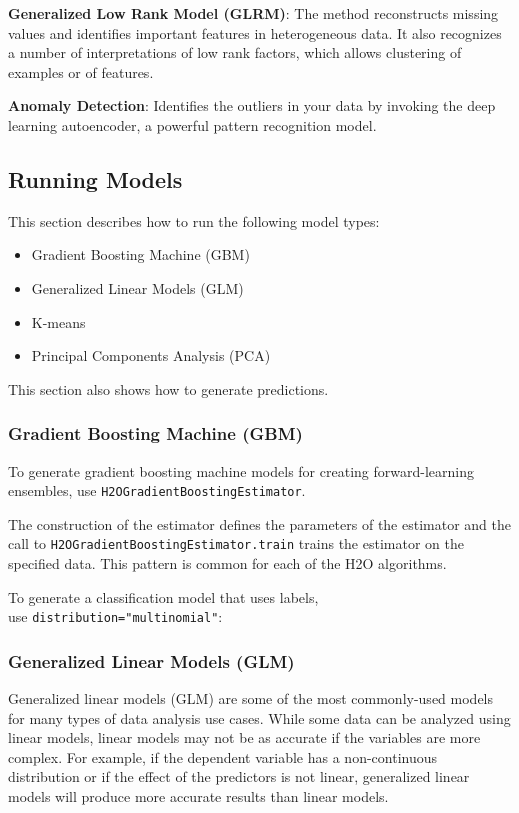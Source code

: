 {{\textbf{Generalized Low Rank Model (GLRM)}}: The method reconstructs missing values and identifies important features in heterogeneous data. It also recognizes a number of  interpretations of low rank factors, which allows clustering of examples or of features.

{\textbf{Anomaly Detection}}: Identifies the outliers in your data by invoking the deep learning autoencoder, a powerful pattern recognition model.

\subsection{Running Models}
This section describes how to run the following model types:

\begin{itemize}
\item Gradient Boosting Machine (GBM)
\item Generalized Linear Models (GLM)
\item K-means
\item Principal Components Analysis (PCA)

\end{itemize}
This section also shows how to generate predictions.

\subsubsection{Gradient Boosting Machine (GBM)}
To generate gradient boosting machine models for creating forward-learning ensembles,
use {\texttt{H2OGradientBoostingEstimator}}.  

The construction of the estimator
defines the parameters of the estimator and the call to
{\texttt{H2OGradientBoostingEstimator.train}}  trains the estimator on
the specified data.  This pattern is common for each of the H2O algorithms.

\newpage



To generate a classification model that uses labels, \\ use 
{\texttt{distribution="multinomial"}}:



\subsubsection{Generalized Linear Models (GLM)}
Generalized linear models (GLM) are some of the most commonly-used
models for many types of data analysis use cases. While some data
can be analyzed using linear models, linear models
may not be as accurate if the variables are more complex.
For example, if the dependent variable has a non-continuous
distribution or if the effect of the predictors is not linear,
generalized linear models will produce more accurate results than linear models.

}
